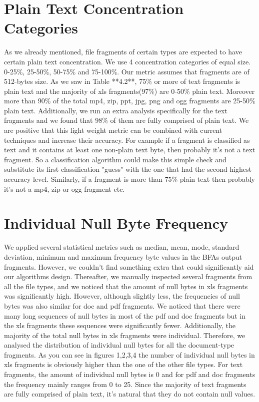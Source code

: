 \section{Plain Text Concentration Categories}
As we already mentioned, file fragments of certain types are expected to have certain plain text concentration. We use 4 concentration categories of equal size. 0-25\%, 25-50\%, 50-75\% and 75-100\%. Our metric assumes that fragments are of 512-bytes size. As we saw in Table **4.2**, 75\% or more of text fragments is plain text and the majority of xls fragments(97\%) are 0-50\% plain text. Moreover more than 90\% of the total mp4, zip, ppt, jpg, png and ogg fragments are 25-50\% plain text. Additionally, we run an extra analysis specifically for the text fragments and we found that 98\% of them are fully comprised of plain text. We are positive that this light weight metric can be combined with current techniques and increase their accuracy. For example if a fragment is classified as text and it contains at least one non-plain text byte, then probably it's not a text fragment. So a classification algorithm could make this simple check and substitute its first classification "guess" with the one that had the second highest accuracy level. Similarly, if a fragment is more than 75\% plain text then probably it's not a mp4, zip or ogg fragment etc.

\section{Individual Null Byte Frequency}
We applied several statistical metrics such as median, mean, mode, standard deviation, minimum and maximum frequency byte values in the BFAs output fragments. However, we couldn't find something extra that could significantly aid our algorithms design. Thereafter, we manually inspected several fragments from all the file types, and we noticed that the amount of null bytes in xls fragments was significantly high. However, although slightly less, the frequencies of null bytes was also similar for doc and pdf fragments. We noticed that there were many long sequences of null bytes in most of the pdf and doc fragments but in the xls fragments these sequences were significantly fewer. Additionally, the majority of the total null bytes in xls fragments were individual. Therefore, we analysed the distribution of individual null bytes for all the document-type fragments. As you can see in figures 1,2,3,4 the number of individual null bytes in xls fragments is obviously higher than the one of the other file types. For text fragments, the amount of individual null bytes is 0 and for pdf and doc fragments the frequency mainly ranges from 0 to 25. Since the majority of text fragments are fully comprised of plain text, it's natural that they do not contain null values.





